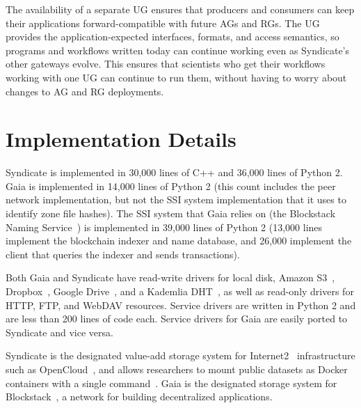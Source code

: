 The availability of a separate UG ensures that producers and consumers can keep
their applications forward-compatible with future AGs and RGs.  The UG provides
the application-expected interfaces, formats, and access semantics, so
programs and workflows written today can continue working even as Syndicate's
other gateways evolve.  This ensures that scientists who get their workflows
working with one UG can continue to run them, without having to worry about
changes to AG and RG deployments.

\section{Implementation Details}

Syndicate is implemented in 30,000 lines of C++ and 36,000 lines of Python 2.
Gaia is implemented in 14,000 lines of Python 2 (this count includes the peer 
network implementation, but not the SSI system implementation that it uses to
identify zone file hashes).  The SSI system that Gaia relies on (the Blockstack
Naming Service~\cite{bns}) is
implemented in 39,000 lines of Python 2 (13,000 lines implement the
blockchain indexer and name database, and 26,000 implement the client that
queries the indexer and sends transactions).

Both Gaia and Syndicate have read-write drivers for local disk, Amazon S3~\cite{s3}, 
Dropbox~\cite{dropbox}, Google Drive~\cite{gdrive}, and a Kademlia
DHT~\cite{kademlia}, as well as read-only drivers for HTTP, FTP, and WebDAV
resources.  Service drivers are written in Python 2 and are less than 200 lines of code
each.  Service drivers for Gaia are easily ported to Syndicate and vice versa.

Syndicate is the designated value-add storage system for
Internet2~\cite{internet2} infrastructure such as OpenCloud~\cite{opencloud},
and allows researchers to mount public datasets as Docker~\cite{docker}
containers with a single command~\cite{sdm}.  Gaia is the designated
storage system for Blockstack~\cite{blockstack}, a network for building
decentralized applications.
